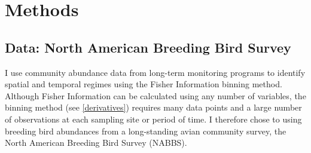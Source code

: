\documentclass[12pt,twoside,openany]{reedthesis}
\begin{document}
\section{Methods}\label{methods-1}

\subsection{Data: North American Breeding Bird
Survey}\label{data-north-american-breeding-bird-survey}

I use community abundance data from long-term monitoring programs to
identify spatial and temporal regimes using the Fisher Information
binning method. Although Fisher Information can be calculated using any
number of variables, the binning method (see \ref{derivatives}) requires
many data points and a large number of observations at each sampling
site or period of time. I therefore chose to using breeding bird
abundances from a long-standing avian community survey, the North
American Breeding Bird Survey (NABBS).
\end{document}
